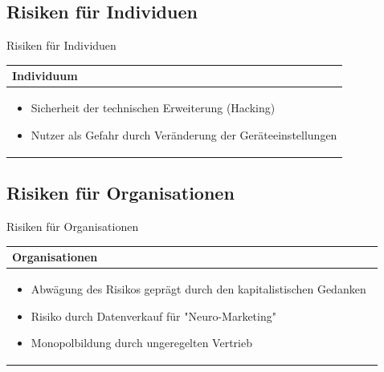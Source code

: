 \documentclass[aspectratio=169,16pt,xcolor=table]{beamer}
\begin{document}
\subsection{Risiken für Individuen}
\begin{frame}{Risiken für Individuen}
\centering
\renewcommand{\arraystretch}{1.5} %
\begin{tabular}{|p{12cm}|}
    \hline
    \rowcolor{blue!25}
    \textbf{Individuum} \\
    \hline
    \begin{itemize}
        \item Sicherheit der technischen Erweiterung (Hacking)
        \item Nutzer als Gefahr durch Veränderung der Geräteeinstellungen
    \end{itemize} \\
    \hline
\end{tabular}
\end{frame}


\subsection{Risiken für Organisationen}

\begin{frame}{Risiken für Organisationen}
\centering
\renewcommand{\arraystretch}{1.5} %
\begin{tabular}{|p{12cm}|}
    \hline
    \rowcolor{blue!25}
    \textbf{Organisationen} \\
    \hline
    \begin{itemize}
        \item Abwägung des Risikos geprägt durch den kapitalistischen Gedanken~\cite{khan_aziz_2019}
        \item Risiko durch Datenverkauf für "Neuro-Marketing"~\cite{khan_aziz_2019}
        \item Monopolbildung durch ungeregelten Vertrieb
    \end{itemize} \\
    \hline
\end{tabular}

\end{frame}

\end{document}
